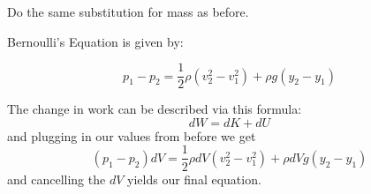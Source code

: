 \documentclass{article}
\begin{document}
\begin{customproof}
Do the same substitution for mass as before.
\end{customproof}

\begin{theorem}
Bernoulli's Equation is given by:

$$p_1 - p_2 = \frac{1}{2} \rho (v_2^2 - v_1^2) + \rho g (y_2 - y_1)$$
\end{theorem}

\begin{customproof}

The change in work can be described via this formula: $$dW = dK + dU$$and plugging in our values from before we get $$(p_1 - p_2)dV = \frac{1}{2}\rho dV (v_2^2 - v_1^2) + \rho dV g (y_2-y_1)$$and cancelling the $dV$ yields our final equation.

\end{customproof}
\end{document}
